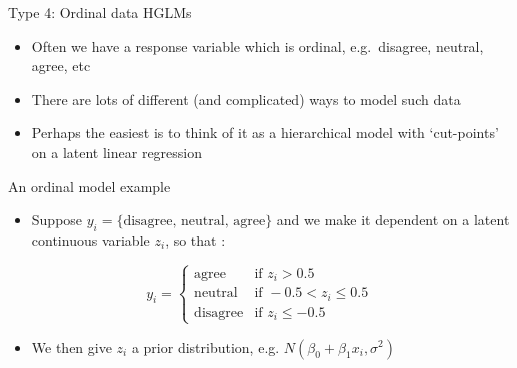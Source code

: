 \documentclass[ignorenonframetext,]{beamer}
\providecommand{\tightlist}{%
  \setlength{\itemsep}{0pt}\setlength{\parskip}{0pt}}
\begin{document}
\begin{frame}{Type 4: Ordinal data HGLMs}

\begin{itemize}
\tightlist
\item
  Often we have a response variable which is ordinal, e.g.~disagree,
  neutral, agree, etc
\item
  There are lots of different (and complicated) ways to model such data
\item
  Perhaps the easiest is to think of it as a hierarchical model with
  `cut-points' on a latent linear regression
\end{itemize}

\end{frame}

\begin{frame}{An ordinal model example}

\begin{itemize}
\tightlist
\item
  Suppose \(y_i = \{\mbox{disagree, neutral, agree} \}\) and we make it
  dependent on a latent continuous variable \(z_i\), so that :
\end{itemize}

\[y_i = \left\{ \begin{array}{ll} \mbox{agree} & \mbox{if } z_i> 0.5 \\
\mbox{neutral} & \mbox{if } -0.5 < z_i \le 0.5 \\
\mbox{disagree} & \mbox{if } z_i \le -0.5 \end{array} \right.\]

\begin{itemize}
\tightlist
\item
  We then give \(z_i\) a prior distribution, e.g.
  \(N(\beta_0 + \beta_1 x_i, \sigma^2)\)
\end{itemize}

\end{frame}
\end{document}
